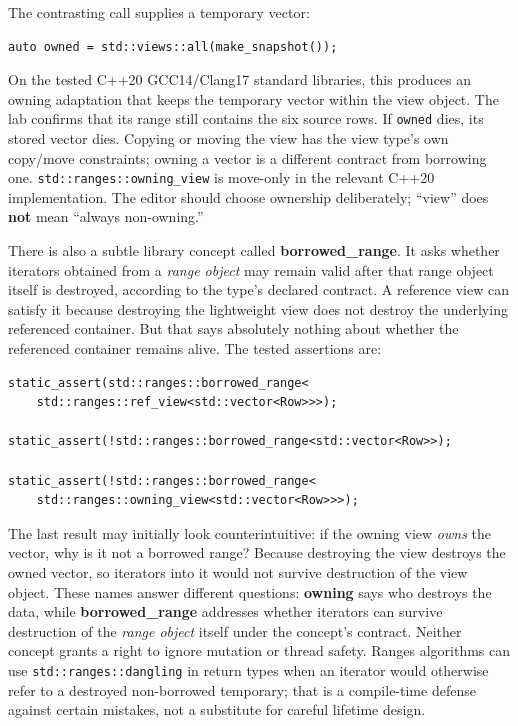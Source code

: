 The contrasting call supplies a temporary vector:

\begin{verbatim}
auto owned = std::views::all(make_snapshot());
\end{verbatim}

On the tested C++20 GCC14/Clang17 standard libraries, this produces an owning adaptation that keeps the temporary vector within the view object. The lab confirms that its range still contains the six source rows. If \texttt{owned} dies, its stored vector dies. Copying or moving the view has the view type's own copy/move constraints; owning a vector is a different contract from borrowing one. \texttt{std::ranges::owning\_view} is move-only in the relevant C++20 implementation. The editor should choose ownership deliberately; ``view'' does \textbf{not} mean ``always non-owning.''

There is also a subtle library concept called \textbf{borrowed\_range}. It asks whether iterators obtained from a \emph{range object} may remain valid after that range object itself is destroyed, according to the type's declared contract. A reference view can satisfy it because destroying the lightweight view does not destroy the underlying referenced container. But that says absolutely nothing about whether the referenced container remains alive. The tested assertions are:

\begin{verbatim}
static_assert(std::ranges::borrowed_range<
    std::ranges::ref_view<std::vector<Row>>>);

static_assert(!std::ranges::borrowed_range<std::vector<Row>>);

static_assert(!std::ranges::borrowed_range<
    std::ranges::owning_view<std::vector<Row>>>);
\end{verbatim}

The last result may initially look counterintuitive: if the owning view \emph{owns} the vector, why is it not a borrowed range? Because destroying the view destroys the owned vector, so iterators into it would not survive destruction of the view object. These names answer different questions: \textbf{owning} says who destroys the data, while \textbf{borrowed\_range} addresses whether iterators can survive destruction of the \emph{range object} itself under the concept's contract. Neither concept grants a right to ignore mutation or thread safety. Ranges algorithms can use \texttt{std::ranges::dangling} in return types when an iterator would otherwise refer to a destroyed non-borrowed temporary; that is a compile-time defense against certain mistakes, not a substitute for careful lifetime design.

